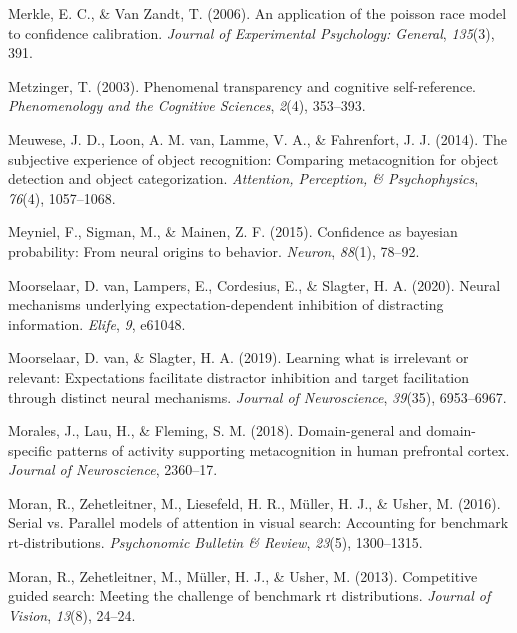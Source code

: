 \documentclass[12pt,twoside]{reedthesis}
\begin{document}
\leavevmode\hypertarget{ref-merkle2006application}{}%
Merkle, E. C., \& Van Zandt, T. (2006). An application of the poisson race model to confidence calibration. \emph{Journal of Experimental Psychology: General}, \emph{135}(3), 391.

\leavevmode\hypertarget{ref-metzinger2003phenomenal}{}%
Metzinger, T. (2003). Phenomenal transparency and cognitive self-reference. \emph{Phenomenology and the Cognitive Sciences}, \emph{2}(4), 353--393.

\leavevmode\hypertarget{ref-meuwese2014subjective}{}%
Meuwese, J. D., Loon, A. M. van, Lamme, V. A., \& Fahrenfort, J. J. (2014). The subjective experience of object recognition: Comparing metacognition for object detection and object categorization. \emph{Attention, Perception, \& Psychophysics}, \emph{76}(4), 1057--1068.

\leavevmode\hypertarget{ref-meyniel2015confidence}{}%
Meyniel, F., Sigman, M., \& Mainen, Z. F. (2015). Confidence as bayesian probability: From neural origins to behavior. \emph{Neuron}, \emph{88}(1), 78--92.

\leavevmode\hypertarget{ref-van2020neural}{}%
Moorselaar, D. van, Lampers, E., Cordesius, E., \& Slagter, H. A. (2020). Neural mechanisms underlying expectation-dependent inhibition of distracting information. \emph{Elife}, \emph{9}, e61048.

\leavevmode\hypertarget{ref-van2019learning}{}%
Moorselaar, D. van, \& Slagter, H. A. (2019). Learning what is irrelevant or relevant: Expectations facilitate distractor inhibition and target facilitation through distinct neural mechanisms. \emph{Journal of Neuroscience}, \emph{39}(35), 6953--6967.

\leavevmode\hypertarget{ref-morales2018domain}{}%
Morales, J., Lau, H., \& Fleming, S. M. (2018). Domain-general and domain-specific patterns of activity supporting metacognition in human prefrontal cortex. \emph{Journal of Neuroscience}, 2360--17.

\leavevmode\hypertarget{ref-moran2016serial}{}%
Moran, R., Zehetleitner, M., Liesefeld, H. R., Müller, H. J., \& Usher, M. (2016). Serial vs. Parallel models of attention in visual search: Accounting for benchmark rt-distributions. \emph{Psychonomic Bulletin \& Review}, \emph{23}(5), 1300--1315.

\leavevmode\hypertarget{ref-moran2013competitive}{}%
Moran, R., Zehetleitner, M., Müller, H. J., \& Usher, M. (2013). Competitive guided search: Meeting the challenge of benchmark rt distributions. \emph{Journal of Vision}, \emph{13}(8), 24--24.
\end{document}
